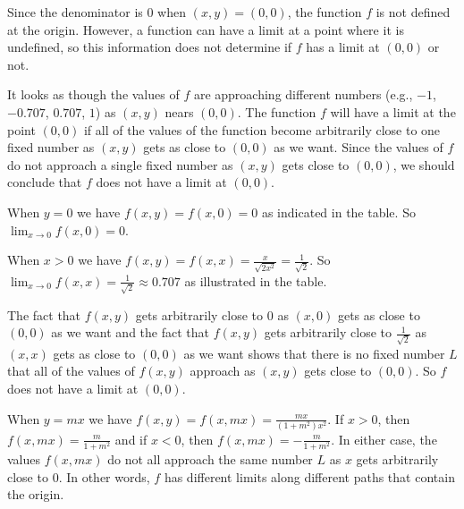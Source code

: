 \begin{activitySolution}
\ba
\item Since the denominator is 0 when $(x,y) = (0,0)$, the function $f$ is not defined at the origin. However, a function can have a limit at a point where it is undefined, so this information does not determine if $f$ has a limit at $(0,0)$ or not.
\item It looks as though the values of $f$ are approaching different numbers (e.g., $-1$, $-0.707$, $0.707$, $1$) as $(x,y)$ nears $(0,0)$. The function $f$ will have a limit at the point $(0,0)$ if all of the values of the function become arbitrarily close to one fixed number as $(x,y)$ gets as close to $(0,0)$ as we want. Since the values of $f$ do not approach a single fixed number as $(x,y)$ gets close to $(0,0)$, we should conclude that $f$ does not have a limit at $(0,0)$.   
\item When $y=0$ we have $f(x,y) = f(x,0) = 0$ as indicated in the table. So $\lim_{x \to 0} f(x,0) = 0$. 
\item When $x > 0$ we have $f(x,y) = f(x,x) = \frac{x}{\sqrt{2x^2}} = \frac{1}{\sqrt{2}}$. So  $\lim_{x \to 0} f(x,x) = \frac{1}{\sqrt{2}} \approx 0.707$ as illustrated in the table.
\item The fact that $f(x,y)$ gets arbitrarily close to $0$ as $(x,0)$ gets as close to $(0,0)$ as we want and the fact that $f(x,y)$ gets arbitrarily close to $\frac{1}{\sqrt{2}}$ as $(x,x)$ gets as close to $(0,0)$ as we want shows that there is no fixed number $L$ that all of the values of $f(x,y)$ approach as $(x,y)$ gets close to $(0,0)$. So $f$ does not have a limit at $(0,0)$. 
\item When $y=mx$ we have $f(x,y) = f(x,mx) = \frac{mx}{(1+m^2)x^2}$. If $x>0$, then $f(x,mx) = \frac{m}{1+m^2}$ and if $x < 0$, then $f(x,mx) = -\frac{m}{1+m^2}$. In either case, the values $f(x,mx)$ do not all approach the same number $L$ as $x$ gets arbitrarily close to $0$. In other words, $f$ has different limits along different paths that contain the origin. 
\ea
\end{activitySolution}

\aftera

